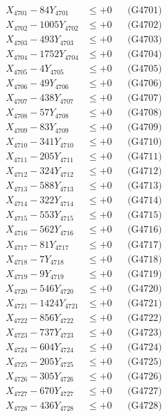 \documentclass[a4paper,10pt]{article}
\begin{document}
{\begin{align}
\allowbreak
X_{4701} - 84Y_{4701} &\leq +0 && \text{(G4701)} \\
X_{4702} - 1005Y_{4702} &\leq +0 && \text{(G4702)} \\
X_{4703} - 493Y_{4703} &\leq +0 && \text{(G4703)} \\
X_{4704} - 1752Y_{4704} &\leq +0 && \text{(G4704)} \\
X_{4705} - 4Y_{4705} &\leq +0 && \text{(G4705)} \\
X_{4706} - 49Y_{4706} &\leq +0 && \text{(G4706)} \\
X_{4707} - 438Y_{4707} &\leq +0 && \text{(G4707)} \\
X_{4708} - 57Y_{4708} &\leq +0 && \text{(G4708)} \\
X_{4709} - 83Y_{4709} &\leq +0 && \text{(G4709)} \\
X_{4710} - 341Y_{4710} &\leq +0 && \text{(G4710)} \\
\allowbreak
X_{4711} - 205Y_{4711} &\leq +0 && \text{(G4711)} \\
X_{4712} - 324Y_{4712} &\leq +0 && \text{(G4712)} \\
X_{4713} - 588Y_{4713} &\leq +0 && \text{(G4713)} \\
X_{4714} - 322Y_{4714} &\leq +0 && \text{(G4714)} \\
X_{4715} - 553Y_{4715} &\leq +0 && \text{(G4715)} \\
X_{4716} - 562Y_{4716} &\leq +0 && \text{(G4716)} \\
X_{4717} - 81Y_{4717} &\leq +0 && \text{(G4717)} \\
X_{4718} - 7Y_{4718} &\leq +0 && \text{(G4718)} \\
X_{4719} - 9Y_{4719} &\leq +0 && \text{(G4719)} \\
X_{4720} - 546Y_{4720} &\leq +0 && \text{(G4720)} \\
\allowbreak
X_{4721} - 1424Y_{4721} &\leq +0 && \text{(G4721)} \\
X_{4722} - 856Y_{4722} &\leq +0 && \text{(G4722)} \\
X_{4723} - 737Y_{4723} &\leq +0 && \text{(G4723)} \\
X_{4724} - 604Y_{4724} &\leq +0 && \text{(G4724)} \\
X_{4725} - 205Y_{4725} &\leq +0 && \text{(G4725)} \\
X_{4726} - 305Y_{4726} &\leq +0 && \text{(G4726)} \\
X_{4727} - 670Y_{4727} &\leq +0 && \text{(G4727)} \\
X_{4728} - 436Y_{4728} &\leq +0 && \text{(G4728)} \\

\end{align}}
\end{document}
